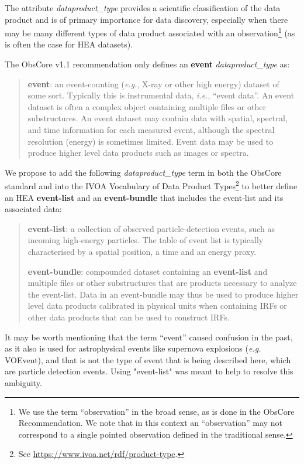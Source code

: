 \documentclass[11pt,a4paper]{ivoa}
\begin{document}
The attribute {\em dataproduct\_type\/} provides a scientific classification of the data product and is of primary importance for data discovery, especially when there may be many different types of data product associated with an observation\footnote{We use the term ``observation'' in the broad sense, as is done in the ObsCore Recommendation. We note that in this context an ``observation'' may not correspond to a single pointed observation defined in the traditional sense.} (as is often the case for \gls{HEA} datasets).

The ObsCore v1.1 recommendation \citep{2017ivoa.spec.0509L} only defines an {\bf event} {\em dataproduct\_type} as:

\begin{quote}
{\bf event}: an event-counting ({\em e.g.\/}, X-ray or other high energy) dataset of some sort. Typically this is instrumental data, {\em i.e.\/}, ``event data''.  An event dataset is often a complex object containing multiple files or other substructures. An event dataset may contain data with spatial, spectral, and time information for each measured event, although the spectral resolution (energy) is sometimes limited. Event data may be used to produce higher level data products such as images or spectra.
\end{quote}

We propose to add the following {\em dataproduct\_type} term in both the ObsCore standard and into the \gls{IVOA} Vocabulary of Data Product Types\footnote{See \url{https://www.ivoa.net/rdf/product-type}.} to better define an \gls{HEA} \textbf{event-list} and an \textbf{event-bundle} that includes the event-list and its associated data:

\begin{quote}
{\bf event-list}: a collection of observed particle-detection events, such as incoming high-energy particles. The table of event list is typically characterised by a spatial position, a time and an energy proxy.

{\bf event-bundle}: compounded dataset containing an {\bf event-list} and multiple files or other substructures that are products necessary to analyze the event-list. Data in an event-bundle may thus be used to produce higher level data products calibrated in physical units when containing \glspl{IRF} or other data products that can be used to construct \glspl{IRF}.
\end{quote}

It may be worth mentioning that the term ``event'' caused confusion in the past, as it also is used for astrophysical events like supernova explosions ({\em e.g.\/} VOEvent), and that is not the type of event that is being described here, which are particle detection events. Using "event-list" was meant to help to resolve this ambiguity.
\end{document}

